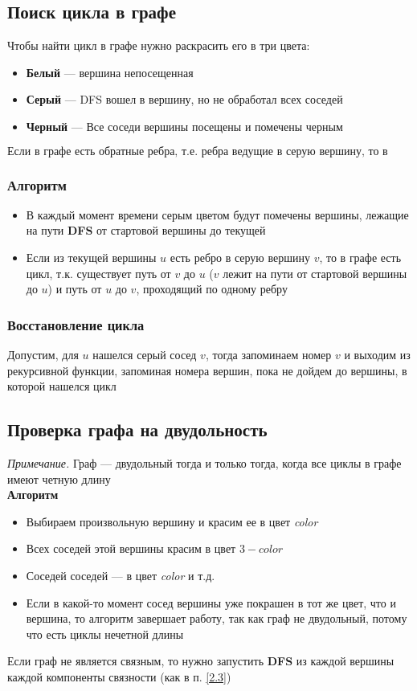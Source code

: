 \documentclass[a4paper]{article}
\newcommand{\dfs}{\textbf{DFS }}
\begin{document}
\subsection{Поиск цикла в графе}
Чтобы найти цикл в графе нужно раскрасить его в три цвета:
\begin{itemize}
    \item \textbf{Белый} — вершина непосещенная
    \item \textbf{Серый} — DFS вошел в вершину, но не обработал всех соседей
    \item \textbf{Черный} — Все соседи вершины посещены и помечены черным
\end{itemize}
$$\boxed{\text{Если в графе есть обратные ребра, т.е. ребра ведущие в серую вершину, то в графе есть цикл}}$$
\subsubsection*{Алгоритм}
\begin{itemize}
    \item В каждый момент времени серым цветом будут помечены вершины, лежащие на пути \dfs от стартовой вершины до текущей
    \item Если из текущей вершины $u$ есть ребро в серую вершину $v$, то в графе есть цикл, т.к. существует путь от $v$ до $u$ ($v$ лежит на пути от стартовой вершины до $u$) и путь от $u$ до $v$, проходящий по одному ребру
\end{itemize}
\subsubsection*{Восстановление цикла}
Допустим, для $u$ нашелся серый сосед $v$, тогда запоминаем номер $v$ и выходим из рекурсивной функции, запоминая номера вершин, пока не дойдем до вершины, в которой нашелся цикл 
 
\subsection{Проверка графа на двудольность}
\textit{Примечание.} Граф — двудольный тогда и только тогда, когда все циклы в графе имеют четную длину\\[2mm]
\textbf{Алгоритм}
\begin{itemize}
    \item Выбираем произвольную вершину и красим ее в цвет \textit{color}
    \item Всех соседей этой вершины красим в цвет $3-color$
    \item Соседей соседей — в цвет \textit{color} и т.д.
    \item Если в какой-то момент сосед вершины уже покрашен в тот же цвет, что и вершина, то алгоритм завершает работу, так как граф не двудольный, потому что есть циклы нечетной длины
\end{itemize}
Если граф не является связным, то нужно запустить \dfs из каждой вершины каждой компоненты связности (как в п. \ref{2.3})
\end{document}
